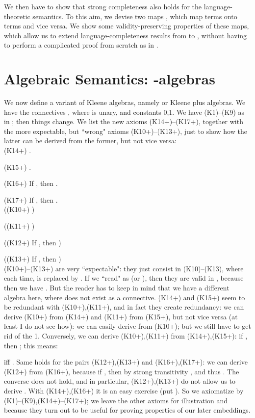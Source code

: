 \documentclass{eptcs}
\begin{document}
We then have to show that strong completeness
also holds for the language-theoretic semantics. To this aim,
we devise two maps , which map  terms onto  terms
and vice versa. We show some validity-preserving 
properties of these maps,
which allow us to extend language-completeness results from
 to , without having to perform a complicated proof from scratch
as in \cite{kozen:completeness}.


\section{Algebraic Semantics: -algebras}

We now define a variant of Kleene algebras, namely  or
Kleene plus algebras. We have the connectives , where
 is unary, and constants 0,1.  We have (K1)--(K9) as in ;
then things change. We list the new axioms (K14+)--(K17+), together
with the more expectable, but ``wrong" axioms (K10+)--(K13+), just to show
how the latter can be derived from the former, but not vice versa:
\\

(K14+) . 

(K15+) .

(K16+) If , then .

(K17+) If , then .
\\

((K10+) )

((K11+) )

((K12+) If , then ) 

((K13+) If , then ) 
\\

(K10+)--(K13+) are very ``expectable": they just consist in
(K10)--(K13), where each time,  is replaced by .
If we ``read"  as  (or ), then they are valid
in ,
because then we have . But the reader has
to keep in mind that we have a different algebra here, where
 does not exist as a connective. (K14+) and (K15+) seem to be redundant
with (K10+),(K11+), and in fact they create redundancy: we can derive
(K10+) from (K14+) and (K11+) from (K15+), but not vice versa
(at least I do not see how): we can easily derive  
 from (K10+); but we still have to get rid of the 1.
Conversely, we can derive (K10+),(K11+) from (K14+),(K15+):
if , then ; this means:

iff .
Same holds for the pairs (K12+),(K13+) and (K16+),(K17+):
we can derive (K12+) from (K16+), because if , then
by strong transitivity , and thus . 
The converse does not hold, 
and in particular, (K12+),(K13+) do not allow us to derive .
With (K14+),(K16+) it is an easy exercise (put ).
So we axiomatize  by (K1)--(K9),(K14+)--(K17+);
we leave the other axioms for illustration and because they turn
out to be useful for proving properties of our later embeddings.
\end{document}
